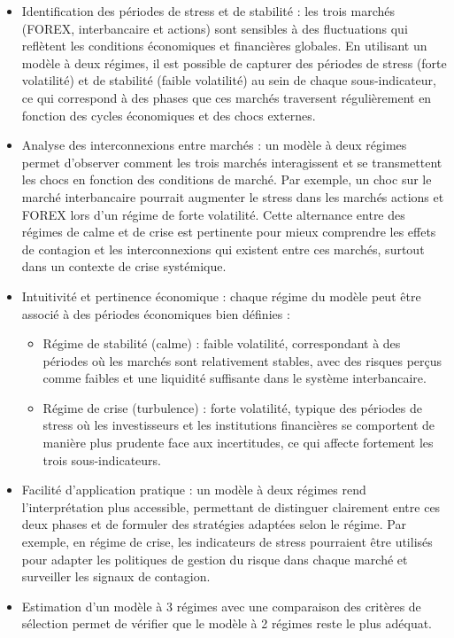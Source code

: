 \begin{itemize}
    \item Identification des périodes de stress et de stabilité : les trois marchés (FOREX, interbancaire et actions) sont sensibles à des fluctuations qui reflètent les conditions économiques et financières globales. En utilisant un modèle à deux régimes, il est possible de capturer des périodes de stress (forte volatilité) et de stabilité (faible volatilité) au sein de chaque sous-indicateur, ce qui correspond à des phases que ces marchés traversent régulièrement en fonction des cycles économiques et des chocs externes.
    \item Analyse des interconnexions entre marchés : un modèle à deux régimes permet d’observer comment les trois marchés interagissent et se transmettent les chocs en fonction des conditions de marché. Par exemple, un choc sur le marché interbancaire pourrait augmenter le stress dans les marchés actions et FOREX lors d'un régime de forte volatilité. Cette alternance entre des régimes de calme et de crise est pertinente pour mieux comprendre les effets de contagion et les interconnexions qui existent entre ces marchés, surtout dans un contexte de crise systémique.
    \item Intuitivité et pertinence économique : chaque régime du modèle peut être associé à des périodes économiques bien définies : 
    \begin{itemize}
        \item Régime de stabilité (calme) : faible volatilité, correspondant à des périodes où les marchés sont relativement stables, avec des risques perçus comme faibles et une liquidité suffisante dans le système interbancaire.
        \item Régime de crise (turbulence) : forte volatilité, typique des périodes de stress où les investisseurs et les institutions financières se comportent de manière plus prudente face aux incertitudes, ce qui affecte fortement les trois sous-indicateurs.
    \end{itemize}
    \item Facilité d’application pratique : un modèle à deux régimes rend l'interprétation plus accessible, permettant de distinguer clairement entre ces deux phases et de formuler des stratégies adaptées selon le régime. Par exemple, en régime de crise, les indicateurs de stress pourraient être utilisés pour adapter les politiques de gestion du risque dans chaque marché et surveiller les signaux de contagion.
    \item Estimation d'un modèle à 3 régimes avec une comparaison des critères de sélection permet de vérifier que le modèle à 2 régimes reste le plus adéquat.
\end{itemize}

